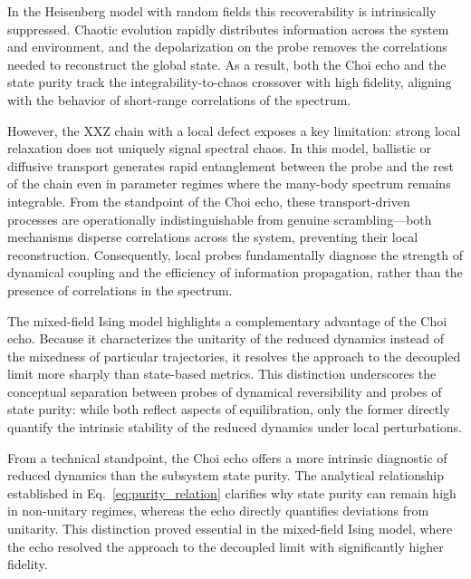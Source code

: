 \documentclass[pra,twocolumn,aps,showpacs,superscriptaddress,longbibliography]{revtex4-2}
\begin{document}
In the Heisenberg model with random fields this recoverability is intrinsically suppressed. Chaotic evolution rapidly distributes information across the system and environment, and the depolarization on the probe removes the correlations needed to reconstruct the global state. As a result, both the Choi echo and the state purity track the integrability-to-chaos crossover with high fidelity, aligning with the behavior of short-range correlations of the spectrum.

However, the XXZ chain with a local defect exposes a key limitation: strong local relaxation does not uniquely signal spectral chaos. In this model, ballistic or diffusive transport generates rapid entanglement between the probe and the rest of the chain even in parameter regimes where the many-body spectrum remains integrable. From the standpoint of the Choi echo, these transport-driven processes are operationally indistinguishable from genuine scrambling—both mechanisms disperse correlations across the system, preventing their local reconstruction. Consequently, local probes fundamentally diagnose the strength of dynamical coupling and the efficiency of information propagation, rather than the presence of correlations in the spectrum.

The mixed-field Ising model highlights a complementary advantage of the Choi echo. Because it characterizes the unitarity of the reduced dynamics instead of the mixedness of particular trajectories, it resolves the approach to the decoupled limit more sharply than state-based metrics. This distinction underscores the conceptual separation between probes of dynamical reversibility and probes of state purity: while both reflect aspects of equilibration, only the former directly quantify the intrinsic stability of the reduced dynamics under local perturbations.

From a technical standpoint, the Choi echo offers a more intrinsic diagnostic of reduced dynamics than the subsystem state purity. The analytical relationship established in Eq.~\eqref{eq:purity_relation} clarifies why state purity can remain high in non-unitary regimes, whereas the echo directly quantifies deviations from unitarity. This distinction proved essential in the mixed-field Ising model, where the echo resolved the approach to the decoupled limit with significantly higher fidelity.
\end{document}
